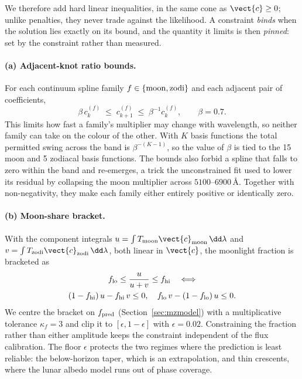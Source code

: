 We therefore add hard linear inequalities, in the same cone as
$\vect{c}\ge0$; unlike penalties, they never trade against the likelihood.
A constraint \emph{binds} when the solution lies exactly on its bound, and
the quantity it limits is then \emph{pinned}: set by the constraint rather
than measured.

\paragraph{(a) Adjacent-knot ratio bounds.} For each continuum spline family
$f\in\{\rm moon, zodi\}$ and each adjacent pair of coefficients,
\begin{equation}
  \beta\,c^{(f)}_k \;\le\; c^{(f)}_{k+1} \;\le\; \beta^{-1} c^{(f)}_k,
  \qquad \beta = 0.7 .
\end{equation}
This limits how fast a family's multiplier may change with wavelength, so
neither family can take on the colour of the other. With $K$ basis functions
the total permitted swing across the band is $\beta^{-(K-1)}$, so the value
of $\beta$ is tied to the 15 moon and 5 zodiacal basis functions. The bounds
also forbid a spline that falls to zero within the band and re-emerges, a
trick the unconstrained fit used to lower its residual by collapsing the
moon multiplier across $5100$--$6900$\,\AA. Together with non-negativity,
they make each family either entirely positive or identically zero.

\paragraph{(b) Moon-share bracket.} With the component integrals
$u = \int T_{\rm moon}\vect{c}_{\rm moon}\,\dd\lambda$ and
$v = \int T_{\rm zodi}\vect{c}_{\rm zodi}\,\dd\lambda$, both linear in
$\vect{c}$, the moonlight fraction is bracketed as
\begin{equation}
\begin{gathered}
  f_{\rm lo}\le\frac{u}{u+v}\le f_{\rm hi}
  \quad\Longleftrightarrow\\
  (1-f_{\rm hi})\,u - f_{\rm hi}\,v\le 0,\quad
  f_{\rm lo}\,v - (1-f_{\rm lo})\,u\le 0 .
\end{gathered}
\end{equation}
We centre the bracket on $f_{\rm pred}$ (Section~\ref{sec:mzmodel}) with a
multiplicative tolerance $\kappa_f = 3$ and clip it to
$[\epsilon, 1-\epsilon]$ with $\epsilon = 0.02$. Constraining the fraction
rather than either amplitude keeps the constraint independent of the flux
calibration. The floor $\epsilon$ protects the two regimes where the
prediction is least reliable: the below-horizon taper, which is an
extrapolation, and thin crescents, where the lunar albedo model runs out of
phase coverage.

